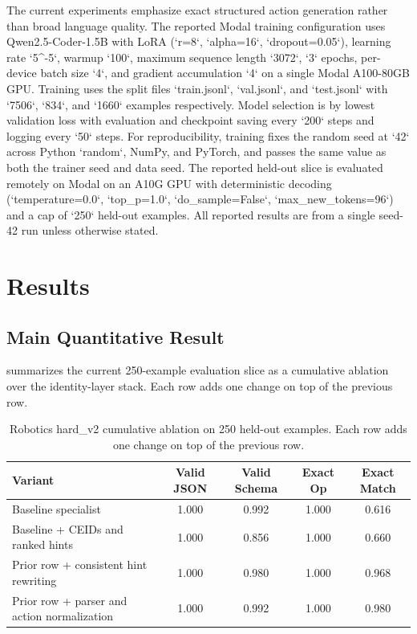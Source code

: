 \documentclass[manuscript,screen,review]{jair}
\begin{document}
The current experiments emphasize exact structured action generation rather than broad language quality. The reported Modal training configuration uses Qwen2.5-Coder-1.5B with LoRA (`r=8`, `alpha=16`, `dropout=0.05`), learning rate `5^{-5}`, warmup `100`, maximum sequence length `3072`, `3` epochs, per-device batch size `4`, and gradient accumulation `4` on a single Modal A100-80GB GPU. Training uses the split files `train.jsonl`, `val.jsonl`, and `test.jsonl` with `7506`, `834`, and `1660` examples respectively. Model selection is by lowest validation loss with evaluation and checkpoint saving every `200` steps and logging every `50` steps. For reproducibility, training fixes the random seed at `42` across Python `random`, NumPy, and PyTorch, and passes the same value as both the trainer seed and data seed. The reported held-out slice is evaluated remotely on Modal on an A10G GPU with deterministic decoding (`temperature=0.0`, `top_p=1.0`, `do_sample=False`, `max_new_tokens=96`) and a cap of `250` held-out examples. All reported results are from a single seed-42 run unless otherwise stated.

\section{Results}
\subsection{Main Quantitative Result}
 summarizes the current 250-example evaluation slice as a cumulative ablation over the identity-layer stack. Each row adds one change on top of the previous row.

\begin{table}[t]
\centering
\caption{Robotics hard\_v2 cumulative ablation on 250 held-out examples. Each row adds one change on top of the previous row.}
\label{tab:robotics-hard-v2-results}
\begin{tabular}{lcccc}
\toprule
Variant & Valid JSON & Valid Schema & Exact Op & Exact Match \\
\midrule
Baseline specialist & 1.000 & 0.992 & 1.000 & 0.616 \\
Baseline + CEIDs and ranked hints & 1.000 & 0.856 & 1.000 & 0.660 \\
Prior row + consistent hint rewriting & 1.000 & 0.980 & 1.000 & 0.968 \\
Prior row + parser and action normalization & 1.000 & 0.992 & 1.000 & 0.980 \\
\bottomrule
\end{tabular}
\end{table}
\end{document}
